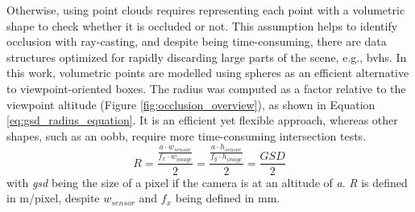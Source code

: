 Otherwise, using point clouds requires representing each point with a volumetric shape to check whether it is occluded or not. This assumption helps to identify occlusion with ray-casting, and despite being time-consuming, there are data structures optimized for rapidly discarding large parts of the scene, e.g., \acrshort{bvh}s. In this work, volumetric points are modelled using spheres as an efficient alternative to viewpoint-oriented boxes. The radius was computed as a factor relative to the viewpoint altitude (Figure \ref{fig:occlusion_overview}), as shown in Equation \ref{eq:gsd_radius_equation}. It is an efficient yet flexible approach, whereas other shapes, such as an \acrshort{oobb}, require more time-consuming intersection tests.
\begin{equation}
    \label{eq:gsd_radius_equation}
    R = \frac{\frac{a \cdot w_{\textit{sensor}}}{f_x \cdot w_{\textit{image}}}}{2} = \frac{\frac{a \cdot h_{\textit{sensor}}}{f_y \cdot h_{\textit{image}}}}{2} = \frac{\textit{GSD}}{2}
\end{equation}
with \textit{\acrshort{gsd}} being the size of a pixel if the camera is at an altitude of \textit{a}. \textit{R} is defined in \si{\meter}/pixel, despite $w_{\textit{sensor}}$ and $f_x$ being defined in \si{\milli\meter}.

